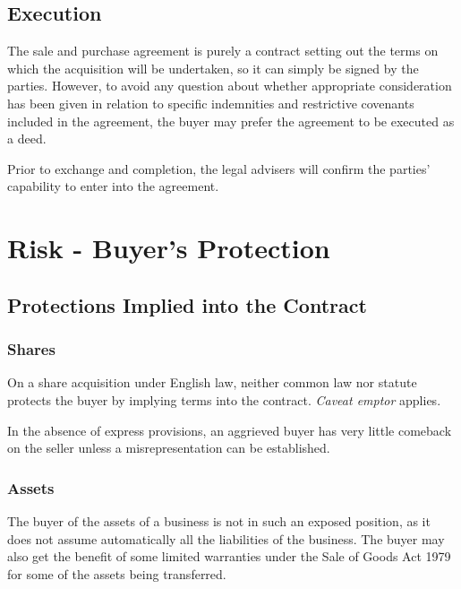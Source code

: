 \documentclass[
]{article}
\begin{document}
\hypertarget{execution-1}{%
\subsection{Execution}\label{execution-1}}

The sale and purchase agreement is purely a contract setting out the
terms on which the acquisition will be undertaken, so it can simply be
signed by the parties. However, to avoid any question about whether
appropriate consideration has been given in relation to specific
indemnities and restrictive covenants included in the agreement, the
buyer may prefer the agreement to be executed as a deed.

Prior to exchange and completion, the legal advisers will confirm the
parties' capability to enter into the agreement.

\hypertarget{risk---buyers-protection}{%
\section{Risk - Buyer's Protection}\label{risk---buyers-protection}}

\hypertarget{protections-implied-into-the-contract}{%
\subsection{Protections Implied into the
Contract}\label{protections-implied-into-the-contract}}

\hypertarget{shares-1}{%
\subsubsection{Shares}\label{shares-1}}

On a share acquisition under English law, neither common law nor statute
protects the buyer by implying terms into the contract. \emph{Caveat
emptor} applies.

In the absence of express provisions, an aggrieved buyer has very little
comeback on the seller unless a misrepresentation can be established.

\hypertarget{assets}{%
\subsubsection{Assets}\label{assets}}

The buyer of the assets of a business is not in such an exposed
position, as it does not assume automatically all the liabilities of the
business. The buyer may also get the benefit of some limited warranties
under the Sale of Goods Act 1979 for some of the assets being
transferred.
\end{document}
